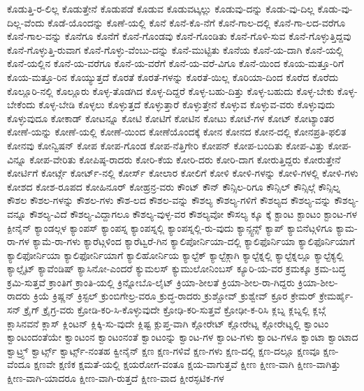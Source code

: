 {ಕೊಡುತ್ತಿ-ರ-ಲಿಲ್ಲ
ಕೊಡುತ್ತೇನೆ
ಕೊಡುಪಡೆ
ಕೊಡುವ
ಕೊಡುವಟ್ಕಲ್ಲು
ಕೊಡುವು-ದನ್ನು
ಕೊಡು-ವು-ದಿಲ್ಲ
ಕೊಡು-ವು-ದಿಲ್ಲ-ವೆಂದು
ಕೊಡೆ-ಯೊಂದನ್ನು
ಕೊಣೆ-ಯಲ್ಲಿ
ಕೊನೆ
ಕೊನೆ-ಕೊ-ನೆಗೆ
ಕೊನೆ-ಗಾಲ-ದಲ್ಲಿ
ಕೊನೆ-ಗಾ-ಲದ-ವರೆಗೂ
ಕೊನೆ-ಗಾಲ-ವನ್ನು
ಕೊನೆಗೂ
ಕೊನೆಗೆ
ಕೊನೆ-ಗೊಂಡವು
ಕೊನೆ-ಗೊಂಡಿತು
ಕೊನೆ-ಗೊಳಿ-ಸುವ
ಕೊನೆ-ಗೊಳ್ಳುತ್ತಿದ್ದವು
ಕೊನೆ-ಗೊಳ್ಳುತ್ತಿ-ರುವಾಗ
ಕೊನೆ-ಗೊಳ್ಳು-ವೆಂಬು-ದನ್ನು
ಕೊನೆ-ಮುಟ್ಟಿತು
ಕೊನೆಯ
ಕೊನೆ-ಯ-ದಾಗಿ
ಕೊನೆ-ಯಲ್ಲಿ
ಕೊನೆ-ಯಲ್ಲಿನ
ಕೊನೆ-ಯ-ವರೆಗೂ
ಕೊನೆ-ಯ-ವರೆಗೆ
ಕೊನೆ-ಯ-ವರೆ-ವಿಗೂ
ಕೊನೆ-ಯಿಂದ
ಕೊಯ-ಮತ್ತೂ-ರಿಗೆ
ಕೊಯ-ಮತ್ತೂ-ರಿನ
ಕೊಯ್ಯುತ್ತದೆ
ಕೊರತೆ
ಕೊರತೆ-ಗಳನ್ನು
ಕೊರತೆ-ಯಿಲ್ಲ
ಕೊರಿಯಾ-ದಿಂದ
ಕೊರೆದ
ಕೊರೆದು
ಕೊಲ್ಲೂರಿ-ನಲ್ಲಿ
ಕೊಲ್ಲೂರು
ಕೊಳ್ಳ-ತೊಡಗಿದ
ಕೊಳ್ಳ-ದಿದ್ದರೆ
ಕೊಳ್ಳ-ಬಹು-ದಿತ್ತು
ಕೊಳ್ಳ-ಬಹುದು
ಕೊಳ್ಳ-ಬೇಕು
ಕೊಳ್ಳ-ಬೇಕೆಂದು
ಕೊಳ್ಳ-ಬೇಡಿ
ಕೊಳ್ಳಲು
ಕೊಳ್ಳುತ್ತದೆ
ಕೊಳ್ಳುತ್ತಾರೆ
ಕೊಳ್ಳುತ್ತೇನೆ
ಕೊಳ್ಳುವ
ಕೊಳ್ಳುವ-ವರು
ಕೊಳ್ಳುವುದು
ಕೊಳ್ಳುವುದೂ
ಕೋಕಾಡ್
ಕೋಟನ್ನೂ
ಕೋಟಿ
ಕೋಟಿಗೆ
ಕೋಟಿನ
ಕೋಟು
ಕೋಟೆ-ಗಳ
ಕೋಟ್
ಕೋಟ್ಯಾಂತರ
ಕೋಣೆ-ಯನ್ನು
ಕೋಣೆ-ಯಲ್ಲಿ
ಕೋಣೆ-ಯಿಂದ
ಕೋಣೆಯೊಂದಕ್ಕೆ
ಕೋನ
ಕೋನದ
ಕೋನ-ದಲ್ಲಿ
ಕೋನಪ್ರತಿ-ಫಲಿತ
ಕೋನವು
ಕೋನ್ವಿಷನ್
ಕೋಪ
ಕೋಪ-ಗೊಂಡ
ಕೋಪ-ನೆತ್ತಿಗೇರಿ
ಕೋಪನ್
ಕೋಪ-ಬಂದಿತು
ಕೋಪ-ವಿತ್ತು
ಕೋಪ-ವಿನ್ನೂ
ಕೋಪ-ವೇರಿತು
ಕೋಪಿಷ್ಠ-ರಾದರು
ಕೋರಿ-ಕೆಯ
ಕೋರಿ-ದರು
ಕೋರಿ-ದಾಗ
ಕೋರುತ್ತಿದ್ದರು
ಕೋರುತ್ತೇನೆ
ಕೋರ್ಟಿಗೆ
ಕೋರ್ಟ್ಗೆ
ಕೋರ್ಟ್-ನಲ್ಲಿ
ಕೋರ್ಸ್
ಕೋಲಾರ
ಕೋಲಿಗೆ
ಕೋಳಿ
ಕೋಳಿ-ಗಳನ್ನು
ಕೋಳಿ-ಗಳಲ್ಲಿ
ಕೋಳಿ-ಗಳು
ಕೋಶದ
ಕೋಶ-ರೂಪದ
ಕೋಹಿನೂರ್
ಕೋಹ್ರನ್ರ-ವರು
ಕೌಂಟ್
ಕೌನ್
ಕೌನ್ಸಿಲ-ರಿಗೂ
ಕೌನ್ಸಿಲ್
ಕೌನ್ಸಿಲ್ಗೆ
ಕೌನ್ಸಿಲ್ನ
ಕೌಶಲ
ಕೌಶಲ-ಗಳನ್ನು
ಕೌಶಲ-ಗಳು
ಕೌಶ-ಲದ
ಕೌಶಲ-ವನ್ನು
ಕೌಶಲ್ಯ
ಕೌಶಲ್ಯ-ಗಳಿಗೆ
ಕೌಶಲ್ಯದ
ಕೌಶಲ್ಯ-ವನ್ನು
ಕೌಶಲ್ಯ-ವನ್ನೂ
ಕೌಶಲ್ಯ-ವಿದೆ
ಕೌಶಲ್ಯ-ವಿದ್ದಾಗಲೂ
ಕೌಶಲ್ಯ-ವುಳ್ಳ-ವರ
ಕೌಶಲ್ಯವೋ
ಕೌಸಲ್ಯ
ಕ್ಕೂ
ಕ್ಕೆ
ಕ್ಟಾಂಟ
ಕ್ಟಾಂಟಂ
ಕ್ಟಾಂಟ-ಗಳ
ಕ್ಪೀನೈನ್
ಕ್ಯಾಂಡಲ್ಗಳ
ಕ್ಯಾಂಪಸ್
ಕ್ಯಾಂಪಸ್ನ
ಕ್ಯಾಂಪಸ್ನಲ್ಲಿ
ಕ್ಯಾಂಪಸ್ನಲ್ಲಿ-ರು-ವುದು
ಕ್ಯಾನ್ಸ್ಟನ್ಸ್
ಕ್ಯಾಪ್
ಕ್ಯಾಬಿನೆಟ್ಗಳಿಗೂ
ಕ್ಯಾಮ-ರಾ-ಗಳ
ಕ್ಯಾಮೆ-ರಾ-ಗಳು
ಕ್ಯಾರೆಟ್ಗಳಿಂದ
ಕ್ಯಾರೆಟ್ವರೆ-ಗಿನ
ಕ್ಯಾಲಿಪೋರ್ನಿಯಾ-ದಲ್ಲಿ
ಕ್ಯಾಲಿಫೊರ್ನಿಯಾ
ಕ್ಯಾಲಿಫೊರ್ನಿಯಾಗೆ
ಕ್ಯಾಲಿಫೋರ್ನಿಯಾ
ಕ್ಯಾಲಿಫೋರ್ನಿಯಾಗೆ
ಕ್ಯಾಲಿಹೋರ್ನಿಯ
ಕ್ಯಾಲ್ಟೆಕ್
ಕ್ಯಾಲ್ಟೆಕ್ಗಾಗಿ
ಕ್ಯಾಲ್ಟೆಕ್ನಲ್ಲಿ
ಕ್ಯಾಲ್ಟೆಕ್ನಲ್ಲೂ
ಕ್ಯಾಲ್ಟೆಕ್ಯಲ್ಲಿ
ಕ್ಯಾಲ್ಸೈಟ್
ಕ್ಯಾವೆಂಡಿಷ್
ಕ್ಯಾಸಿನೋ-ಎಂದರೆ
ಕ್ಯುಮಲಸ್
ಕ್ಯುಮುಲೋನಿಂಬಸ್
ಕ್ಯೂರಿ-ಯ-ವರ
ಕ್ರಮಕ್ಕೂ
ಕ್ರಮ-ಬದ್ಧ
ಕ್ರಮಿ-ಸುತ್ತವೆ
ಕ್ರಾಂತಿಗೆ
ಕ್ರಾಂತಿ-ಯಲ್ಲಿ
ಕ್ರಿನ್ನೋಬೊ-ಲೈಟ್
ಕ್ರಿಯಾ-ಶೀಲತೆ
ಕ್ರಿಯಾ-ಶೀಲ-ರಾ-ಗಿದ್ದರು
ಕ್ರಿಯಾ-ಶೀಲ-ರಾದರು
ಕ್ರಿಯೆ
ಕ್ರಿಷ್ಣನ್
ಕ್ರಿಸ್ಟಲ್
ಕ್ರುಂಬಿಗೇಲ್ರ-ವರೂ
ಕ್ರುದ್ಧ-ರಾದರು
ಕ್ರುಶ್ಚೋವ್
ಕ್ರುಶ್ವೇವ್
ಕ್ರೂರ
ಕ್ರೇಮರ್
ಕ್ರೇಮರ್ಹೈ-ಸನ್
ಕ್ರೈಗ್
ಕ್ರೈಗ್ರ-ವರು
ಕ್ರೋಡಿ-ಕರಿ-ಸಿ-ಕೊಳ್ಳುವುದೇ
ಕ್ರೋಢಿ-ಕರಿ-ಸುತ್ತವೆ
ಕ್ರೋಢೀ-ಕ-ರಿಸಿ
ಕ್ಲಬ್ನ
ಕ್ಲಬ್ನಲ್ಲಿ
ಕ್ಲಬ್ಗೆ
ಕ್ಲಾಸಿನವನೆ
ಕ್ಲಾಸ್
ಕ್ಲಿಂಟನ್
ಕ್ಲಿಕ್ಕಿ-ಸು-ವುದೇ
ಕ್ಲಿಷ್ಟ
ಕ್ಲುಪ್ತ-ವಾಗಿ
ಕ್ಲೋರೇಟ್
ಕ್ಲೋರೇಟ್ನ
ಕ್ಲೋರೇಟ್ನಲ್ಲಿ
ಕ್ವಾಂಟಂ
ಕ್ವಾಂಟಂದಂತೆಯೇ
ಕ್ವಾಂಟಂನ
ಕ್ವಾಂಟಂನಂತೆ
ಕ್ವಾಂಟಂನ್ನು
ಕ್ವಾಂಟ-ಗಳ
ಕ್ವಾಂಟ-ಗಳು
ಕ್ವಾಂಟ-ಗಳೂ
ಕ್ವಾಂಟಾ
ಕ್ವಾಂಟಾದ
ಕ್ವಾಟ್ರ್ಸ್
ಕ್ವಾರ್ಟ್ಸ್
ಕ್ವಾರ್ಟ್ಸ್-ನಂತಹ
ಕ್ವೀನೈನ್
ಕ್ಷಣ
ಕ್ಷಣ-ಗಳಿವೆ
ಕ್ಷಣ-ಗಳು
ಕ್ಷಣ-ದಲ್ಲಿ
ಕ್ಷಣ-ದಲ್ಲೂ
ಕ್ಷಣವೂ
ಕ್ಷಣ-ವೆಂದೂ
ಕ್ಷಣವೇ
ಕ್ಷಣಿಕ
ಕ್ಷಮತೆ-ಯಲ್ಲಿ
ಕ್ಷಯರೋಗ-ವಂತೂ
ಕ್ಷಯ-ವಾಗುತ್ತವೆ
ಕ್ಷೀಣ
ಕ್ಷೀಣ-ವಾಗಿ
ಕ್ಷೀಣ-ವಾಗಿತ್ತು
ಕ್ಷೀಣ-ವಾಗಿ-ಯಾದರೂ
ಕ್ಷೀಣ-ವಾಗಿ-ರುತ್ತದೆ
ಕ್ಷೀಣ-ವಾದ
ಕ್ಷೀರಸ್ಫಟಿಕ-ಗಳ
}
